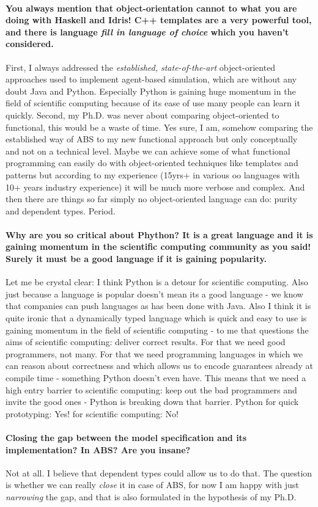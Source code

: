 \paragraph{You always mention that object-orientation cannot to what you are doing with Haskell and Idris! C++ templates are a very powerful tool, and there is language \textit{fill in language of choice} which you haven't considered.}
First, I always addressed the \textit{established, state-of-the-art} object-oriented approaches used to implement agent-based simulation, which are without any doubt Java and Python. Especially Python is gaining huge momentum in the field of scientific computing because of its ease of use many people can learn it quickly. Second, my Ph.D. was never about comparing object-oriented to functional, this would be a waste of time. Yes sure, I am, somehow comparing the established way of ABS to my new functional approach but only conceptually and not on a technical level. Maybe we can achieve some of what functional programming can easily do with object-oriented techniques like templates and patterns but according to my experience (15yrs+ in various oo languages with 10+ years industry experience) it will be much more verbose and complex. And then there are things so far simply no object-oriented language can do: purity and dependent types. Period.

\paragraph{Why are you so critical about Phython? It is a great language and it is gaining momentum in the scientific computing community as you said! Surely it must be a good language if it is gaining popularity.}
Let me be crystal clear: I think Python is a detour for scientific computing. Also just because a language is popular doesn't mean its a good language - we know that companies can push languages as has been done with Java. Also I think it is quite ironic that a dynamically typed language which is quick and easy to use is gaining momentum in the field of scientific computing - to me that questions the aims of scientific computing: deliver correct results. For that we need good programmers, not many. For that we need programming languages in which we can reason about correctness and which allows us to encode guarantees already at compile time - something Python doesn't even have. This means that we need a high entry barrier to scientific computing: keep out the bad programmers and invite the good ones - Python is breaking down that barrier. Python for quick prototyping: Yes! for scientific computing: No!

\paragraph{Closing the gap between the model specification and its implementation? In ABS? Are you insane?}
Not at all. I believe that dependent types could allow us to do that. The question is whether we can really \textit{close} it in case of ABS, for now I am happy with just \textit{narrowing} the gap, and that is also formulated in the hypothesis of my Ph.D.
